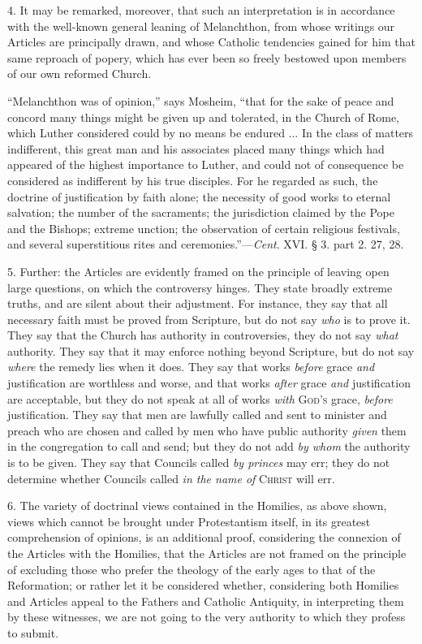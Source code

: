 4. It may be remarked, moreover, that such an interpretation is in
accordance with the well-known general leaning of Melanchthon,
from whose writings our Articles are principally drawn, and whose
Catholic tendencies gained for him that same reproach of popery, which
has ever been so freely bestowed upon members of our own reformed
Church.

``Melanchthon was of opinion,'' says
Mosheim, ``that for the sake of peace and concord many things
might be given up and tolerated, in the Church of Rome, which Luther
considered could by no means be endured ... In the class of matters
indifferent, this great man and his associates placed many things
which had appeared of the highest importance to Luther, and could not
of consequence be considered as indifferent by his true disciples. For
he regarded as such, the doctrine of justification by faith alone; the
necessity of good works to eternal salvation; the number of the
sacraments; the jurisdiction claimed by the Pope and the Bishops;
extreme unction; the observation of certain religious festivals, and
several superstitious rites and ceremonies.''—\emph{Cent}. XVI.
§ 3. part 2. 27, 28.

5. Further: the Articles are evidently framed on the principle of
leaving open large questions, on which the controversy hinges. They
state broadly extreme truths, and are silent about their adjustment.
For instance, they say that all necessary faith must be proved from
Scripture, but do not say \emph{who} is to prove it. They say that the
Church has authority in controversies, they do not say \emph{what}
authority. They say that it may enforce nothing beyond Scripture, but
do not say \emph{where} the remedy lies when it does. They say that
works \emph{before} grace \emph{and} justification are worthless and
worse, and that works \emph{after} grace \emph{and} justification are
acceptable, but they do not speak at all of works \emph{with} G\textsc{od's}
grace, \emph{before} justification. They say that men are lawfully
called and sent to minister and preach who are chosen and called by
men who have public authority \emph{given} them in the congregation to
call and send; but they do not add \emph{by whom} the authority is to
be given. They say that Councils called \emph{by princes} may err;
they do not determine whether Councils called \emph{in the name of} C\textsc{hrist}
will err.

6. The variety of doctrinal views contained in the Homilies, as
above shown, views which cannot be brought under Protestantism itself,
in its greatest comprehension of opinions, is an additional proof,
considering the connexion of the Articles with the Homilies, that the
Articles are not framed on the principle of excluding those who prefer
the theology of the early ages to that of the Reformation; or rather
let it be considered whether, considering both Homilies and Articles
appeal to the Fathers and Catholic Antiquity, in interpreting them by
these witnesses, we are not going to the very authority to which they
profess to submit.

